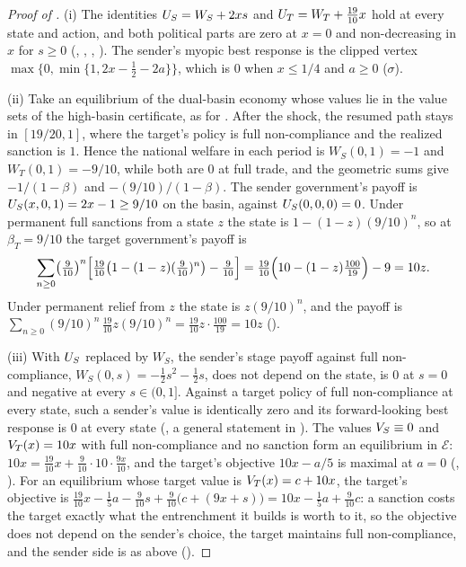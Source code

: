 \begin{proof}[Proof of ]
(i) The identities $U_S=W_S+2xs$ and $U_T=W_T+\tfrac{19}{10}x$ hold at every
state and action, and both political parts are zero at $x=0$ and
non-decreasing in $x$ for $s\ge0$ (, ,
,
). The sender's myopic best response is the
clipped vertex $\max\{0,\min\{1,2x-\tfrac12-2a\}\}$, which is $0$ when
$x\le1/4$ and $a\ge0$ ($\sigma$).

(ii) Take an equilibrium of the dual-basin economy whose values lie in the
value sets of the high-basin certificate, as for
. After the shock, the resumed path stays
in $[19/20,1]$, where the target's policy is full non-compliance and the realized
sanction is $1$. Hence the national welfare in each period is
$W_S(0,1)=-1$ and $W_T(0,1)=-9/10$, while both are $0$ at full trade, and the
geometric sums give $-1/(1-\beta)$ and $-(9/10)/(1-\beta)$. The sender
government's payoff is $U_S(x,0,1)=2x-1\ge9/10$ on the basin, against
$U_S(0,0,0)=0$. Under permanent full sanctions from a state $z$ the state is
$1-(1-z)(9/10)^n$, so at $\beta_T=9/10$ the target government's payoff is
\[
\sum_{n\ge0}\bigl(\tfrac{9}{10}\bigr)^n
\Bigl[\tfrac{19}{10}\bigl(1-(1-z)(\tfrac{9}{10})^n\bigr)-\tfrac{9}{10}\Bigr]
=\tfrac{19}{10}\Bigl(10-(1-z)\tfrac{100}{19}\Bigr)-9=10z .
\]
Under permanent relief from $z$ the state is $z(9/10)^n$, and the payoff is
$\sum_{n\ge0}(9/10)^n\,\tfrac{19}{10}z(9/10)^n=\tfrac{19}{10}z\cdot\tfrac{100}{19}=10z$
().

(iii) With $U_S$ replaced by $W_S$, the sender's stage payoff against full
non-compliance, $W_S(0,s)=-\tfrac12s^2-\tfrac12s$, does not depend on the state, is
$0$ at $s=0$ and negative at every $s\in(0,1]$. Against a target policy of full
non-compliance at every state, such a sender's value is identically zero and its
forward-looking best response is $0$ at every state
(, a general statement in
). The values $V_S\equiv0$ and
$V_T(x)=10x$ with full non-compliance and no sanction form an equilibrium in
$\mathcal E$: $10x=\tfrac{19}{10}x+\tfrac{9}{10}\cdot10\cdot\tfrac{9x}{10}$, and the
target's objective $10x-a/5$ is maximal at $a=0$ (,
). For an equilibrium whose target value is
$V_T(x)=c+10x$, the target's objective is
$\tfrac{19}{10}x-\tfrac15a-\tfrac{9}{10}s+\tfrac{9}{10}\bigl(c+(9x+s)\bigr)
=10x-\tfrac15a+\tfrac{9}{10}c$: a sanction costs the target exactly what the
entrenchment it builds is worth to it, so the objective does not depend on the
sender's choice, the target maintains full non-compliance, and the sender side is as above
().
\end{proof}
